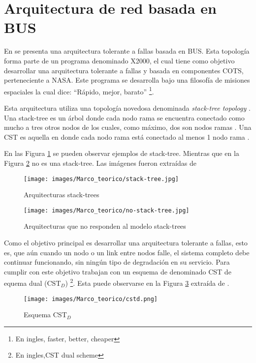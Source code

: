  \section{Arquitectura de red basada en BUS}\label{sec:bus}
En \cite{Tai99} se presenta una arquitectura tolerante a fallas basada en BUS. Esta topología forma parte de un programa denominado X2000, el cual tiene como objetivo desarrollar una arquitectura tolerante a fallas y basada en componentes COTS, perteneciente a \ac{NASA}. Este programa se desarrolla bajo una filosofía de misiones espaciales la cual dice: ``Rápido, mejor, barato'' \footnote{En ingles, faster, better, cheaper}.

Esta arquitectura utiliza una topología novedosa denominada \textit{stack-tree topology} \citep{Chau99} \citep{Tai99}. Una stack-tree es un árbol donde cada nodo rama se encuentra conectado como mucho a tres otros nodos de los cuales, como máximo, dos son nodos ramas \citep{Tai99}. Una \ac{CST} es aquella en donde cada nodo rama está conectado al menos 1 nodo rama \citep{Tai99}.

En las Figura \ref{fig:stack-tree} se pueden observar ejemplos de stack-tree. Mientras que en la Figura \ref{fig:no-stack-tree} no es una stack-tree. Las imágenes fueron extraídas de \cite{Tai99}

\begin{figure}[h]
 \centering
 \texttt{[image: images/Marco\_teorico/stack-tree.jpg]}
  \caption{Arquitecturas stack-trees}
\label{fig:stack-tree}
\end{figure}

\begin{figure}[h]
 \centering
 \texttt{[image: images/Marco\_teorico/no-stack-tree.jpg]}
  \caption{Arquitecturas que no responden al modelo stack-trees}
\label{fig:no-stack-tree}
\end{figure}

Como el objetivo principal es desarrollar una arquitectura tolerante a fallas, esto es, que aún cuando un nodo o un link entre nodos falle, el sistema completo debe continuar funcionando, sin ningún tipo de degradación en su servicio. Para cumplir con este objetivo \cite{Tai99} trabajan con un esquema de denominado \ac{CST} de equema dual (\ac{CST}$_D$) \footnote{En ingles,\ac{CST} dual scheme}. Esta puede observarse en la Figura \ref{fig:cstd} extraída de \cite{Tai99}.

\begin{figure}[h]
 \centering
 \texttt{[image: images/Marco\_teorico/cstd.png]}
  \caption{Esquema CST$_D$}
\label{fig:cstd}
\end{figure}


